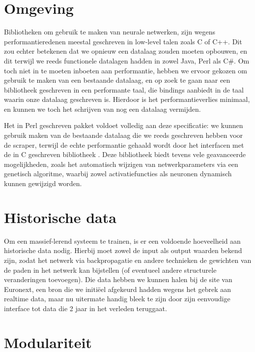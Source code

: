 \section{Omgeving}

Bibliotheken om gebruik te maken van neurale netwerken, zijn wegens performantieredenen meestal geschreven in low-level talen zoals C of C++. Dit zou echter betekenen dat we opnieuw een datalaag zouden moeten opbouwen, en dit terwijl we reeds functionele datalagen hadden in zowel Java, Perl als C\#. Om toch niet in te moeten inboeten aan performantie, hebben we ervoor gekozen om gebruik te maken van een bestaande datalaag, en op zoek te gaan naar een bibliotheek geschreven in een performante taal, die bindings aanbiedt in de taal waarin onze datalaag geschreven is. Hierdoor is het performantieverlies minimaal, en kunnen we toch het schrijven van nog een datalaag vermijden.

Het in Perl geschreven  pakket voldoet volledig aan deze specificatie: we kunnen gebruik maken van de bestaande datalaag die we reeds geschreven hebben voor de scraper, terwijl de echte performantie gehaald wordt door het interfacen met de in C geschreven bibliotheek . Deze bibliotheek biedt tevens vele geavanceerde mogelijkheden, zoals het automatisch wijzigen van netwerkparameters via een genetisch algoritme, waarbij zowel activatiefuncties als neuronen dynamisch kunnen gewijzigd worden.


\section{Historische data}

Om een massief-lerend systeem te trainen, is er een voldoende hoeveelheid aan historische data nodig. Hierbij moet zowel de input als output waarden bekend zijn, zodat het netwerk via backpropagatie en andere technieken de gewichten van de paden in het netwerk kan bijstellen (of eventueel andere structurele veranderingen toevoegen). Die data hebben we kunnen halen bij de site van Euronext, een bron die we initi\"eel afgekeurd hadden wegens het gebrek aan realtime data, maar nu uitermate handig bleek te zijn door zijn eenvoudige interface tot data die 2 jaar in het verleden teruggaat.


\section{Modulariteit}

